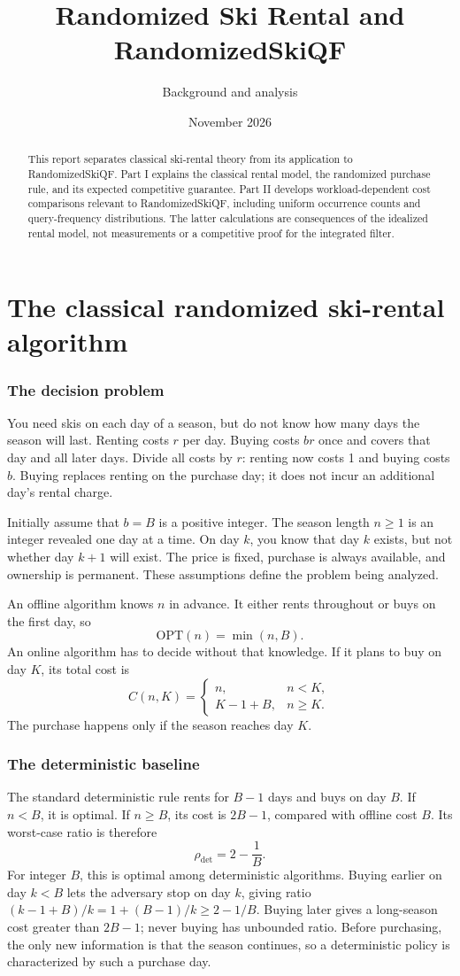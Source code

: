 \documentclass[11pt]{article}
\title{Randomized Ski Rental and RandomizedSkiQF}
\author{Background and analysis}
\date{November 2026}
\begin{document}
\maketitle
\begin{abstract}
This report separates classical ski-rental theory from its application to RandomizedSkiQF. Part I explains the classical rental model, the randomized purchase rule, and its expected competitive guarantee. Part II develops workload-dependent cost comparisons relevant to RandomizedSkiQF, including uniform occurrence counts and query-frequency distributions. The latter calculations are consequences of the idealized rental model, not measurements or a competitive proof for the integrated filter.
\end{abstract}
\part{The classical randomized ski-rental algorithm}
\section{The decision problem}
You need skis on each day of a season, but do not know how many days the season will last. Renting costs $r$ per day. Buying costs $br$ once and covers that day and all later days. Divide all costs by $r$: renting now costs 1 and buying costs $b$. Buying replaces renting on the purchase day; it does not incur an additional day's rental charge.

Initially assume that $b=B$ is a positive integer. The season length $n\ge1$ is an integer revealed one day at a time. On day $k$, you know that day $k$ exists, but not whether day $k+1$ will exist. The price is fixed, purchase is always available, and ownership is permanent. These assumptions define the problem being analyzed.

An offline algorithm knows $n$ in advance. It either rents throughout or buys on the first day, so
\[
\mathrm{OPT}(n)=\min(n,B).
\]
An online algorithm has to decide without that knowledge. If it plans to buy on day $K$, its total cost is
\[
C(n,K)=\begin{cases}n,&n<K,\\K-1+B,&n\ge K.\end{cases}
\]
The purchase happens only if the season reaches day $K$.

\section{The deterministic baseline}
The standard deterministic rule rents for $B-1$ days and buys on day $B$. If $n<B$, it is optimal. If $n\ge B$, its cost is $2B-1$, compared with offline cost $B$. Its worst-case ratio is therefore
\[
\rho_{\mathrm{det}}=2-\frac1B.
\]
For integer $B$, this is optimal among deterministic algorithms. Buying earlier on day $k<B$ lets the adversary stop on day $k$, giving ratio $(k-1+B)/k=1+(B-1)/k\ge2-1/B$. Buying later gives a long-season cost greater than $2B-1$; never buying has unbounded ratio. Before purchasing, the only new information is that the season continues, so a deterministic policy is characterized by such a purchase day.
\end{document}
